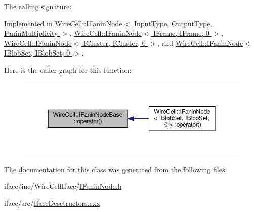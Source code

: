 The calling signature\+: 



Implemented in \hyperlink{class_wire_cell_1_1_i_fanin_node_a36fa55f6c92585211789beab2e2ef46a}{Wire\+Cell\+::\+I\+Fanin\+Node$<$ Input\+Type, Output\+Type, Fanin\+Multiplicity $>$}, \hyperlink{class_wire_cell_1_1_i_fanin_node_a36fa55f6c92585211789beab2e2ef46a}{Wire\+Cell\+::\+I\+Fanin\+Node$<$ I\+Frame, I\+Frame, 0 $>$}, \hyperlink{class_wire_cell_1_1_i_fanin_node_a36fa55f6c92585211789beab2e2ef46a}{Wire\+Cell\+::\+I\+Fanin\+Node$<$ I\+Cluster, I\+Cluster, 0 $>$}, and \hyperlink{class_wire_cell_1_1_i_fanin_node_a36fa55f6c92585211789beab2e2ef46a}{Wire\+Cell\+::\+I\+Fanin\+Node$<$ I\+Blob\+Set, I\+Blob\+Set, 0 $>$}.

Here is the caller graph for this function\+:
\nopagebreak
\begin{figure}[H]
\begin{center}
\leavevmode
\includegraphics[width=350pt]{class_wire_cell_1_1_i_fanin_node_base_a7fd741cc204d2eb03402709bff0694f2_icgraph}
\end{center}
\end{figure}


The documentation for this class was generated from the following files\+:\begin{DoxyCompactItemize}
\item 
iface/inc/\+Wire\+Cell\+Iface/\hyperlink{_i_fanin_node_8h}{I\+Fanin\+Node.\+h}\item 
iface/src/\hyperlink{_iface_desctructors_8cxx}{Iface\+Desctructors.\+cxx}\end{DoxyCompactItemize}
